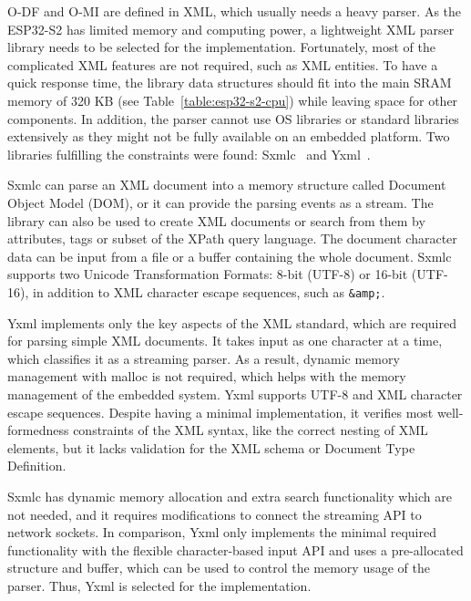 O-DF and O-MI are defined in XML, which usually needs a heavy parser. As the ESP32-S2 has limited memory and computing power, a lightweight XML parser library needs to be selected for the implementation. Fortunately, most of the complicated XML features are not required, such as XML entities. To have a quick response time, the library data structures should fit into the main SRAM memory of 320 KB (see Table~\ref{table:esp32-s2-cpu}) while leaving space for other components. In addition, the parser cannot use OS libraries or standard libraries extensively as they might not be fully available on an embedded platform. Two libraries fulfilling the constraints were found: Sxmlc~\cite{sxmlc} and Yxml~\cite{yxml}.

Sxmlc can parse an XML document into a memory structure called Document Object Model (DOM), or it can provide the parsing events as a stream. The library can also be used to create XML documents or search from them by attributes, tags or subset of the XPath query language. The document character data can be input from a file or a buffer containing the whole document. Sxmlc supports two Unicode Transformation Formats: 8-bit (UTF-8) or 16-bit (UTF-16), in addition to XML character escape sequences, such as \verb|&amp;|.~\cite{sxmlc}

Yxml implements only the key aspects of the XML standard, which are required for parsing simple XML documents. It takes input as one character at a time, which classifies it as a streaming parser. As a result, dynamic memory management with malloc is not required, which helps with the memory management of the embedded system. Yxml supports UTF-8 and XML character escape sequences. Despite having a minimal implementation, it verifies most well-formedness constraints of the XML syntax, like the correct nesting of XML elements, but it lacks validation for the XML schema or Document Type Definition.~\cite{yxml}

Sxmlc has dynamic memory allocation and extra search functionality which are not needed, and it requires modifications to connect the streaming API to network sockets. In comparison, Yxml only implements the minimal required functionality with the flexible character-based input API and uses a pre-allocated structure and buffer, which can be used to control the memory usage of the parser. Thus, Yxml is selected for the implementation.

